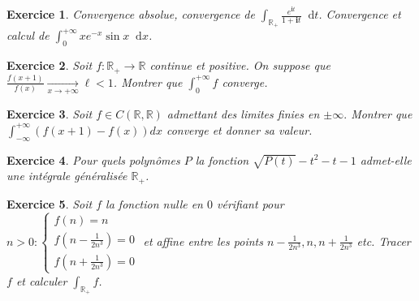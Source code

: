\documentclass[12pt,a4paper]{article}
\newcommand{\R}{\mathbb{R}}
\newcommand{\I}{\mathbf{i}}
\newcommand{\diff}{\mathop{}\mathopen{}\mathrm{d}}%
{%
\theoremstyle{break}
\theoremprework{%
\rule{0.5\linewidth}{0.3pt}}
\theorempostwork{\hfill%
\rule{0.5\linewidth}{0.3pt}}
\theoremheaderfont{\scshape}
\theoremseparator{ ---}
\newtheorem{Prop}{%
\textcolor{blue}{Proposition}}[section]
}
\theoremstyle{break}
\newtheorem{Exo}{Exercice}
\begin{document}
\begin{Exo}
	Convergence absolue, convergence de $\displaystyle\int_{\R_+}\frac{e^{\I t}}{1+\I t}\diff t$. Convergence et calcul de $\int_{0}^{+\infty}xe^{-x}\sin x\diff x$.
\end{Exo}
 
 \begin{Exo}
 	Soit $f:\R_+\to \R$ continue et positive. On suppose que $\frac{f(x+1)}{f(x)}\underset{x\to+\infty}{\to}\ell<1$. Montrer que $\int_{ 0}^{+\infty}f$ converge.
 \end{Exo}
 

\begin{Exo}
	 Soit $f\in C\left( \R,\R\right) $ admettant des
limites finies en $\pm \infty .$ Montrer que $\displaystyle\int_{-\infty}^{+\infty}\left(
f\left( x+1\right) -f\left( x\right) \right) dx$ converge et donner sa
valeur.
\end{Exo}

 \begin{Exo}
 	Pour quels polyn\^{o}mes $P$ la fonction $\sqrt{P\left( t\right) }%
-t^{2}-t-1$ admet-elle une int\'{e}grale g\'{e}n\'{e}ralis\'{e}e $\R
_{+}$.
 \end{Exo}

\begin{Exo}
	Soit $f$ la fonction nulle en $0$ vérifiant pour $n>0: 
	\begin{cases}
			f\left( n\right) =n \\ 
			f\left( n-\frac{1}{2n^{3}}\right) =0 \\ 
			f\left( n+\frac{1}{2n^{3}}\right) =0
	\end{cases}$
	et affine entre les points $n-\frac{1}{2n^{3}},n,n+\frac{1}{2n^{3}}$ etc.
	Tracer $f$ et calculer $\int_{\mathbb{R}_{+}}f$.
\end{Exo}
\end{document}
